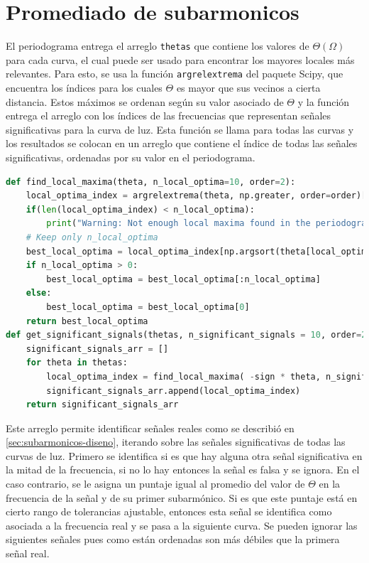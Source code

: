 \section{Promediado de subarmonicos}\label{sec:subarmonicos-implementacion}
El periodograma entrega el arreglo \texttt{thetas} que contiene los valores de $\Theta(\Omega)$ para cada curva, el cual puede ser usado para encontrar los mayores locales más relevantes. Para esto, se usa la función \texttt{argrelextrema} del paquete Scipy, que encuentra los índices para los cuales $\Theta$ es mayor que sus vecinos a cierta distancia. Estos máximos se ordenan según su valor asociado de $\Theta$ y la función entrega el arreglo con los índices de las frecuencias que representan señales significativas para la curva de luz. Esta función se llama para todas las curvas y los resultados se colocan en un arreglo que contiene el índice de todas las señales significativas, ordenadas por su valor en el periodograma.
\begin{lstlisting}[language=Python]
def find_local_maxima(theta, n_local_optima=10, order=2):
    local_optima_index = argrelextrema(theta, np.greater, order=order)[0]
    if(len(local_optima_index) < n_local_optima):
        print("Warning: Not enough local maxima found in the periodogram")
    # Keep only n_local_optima
    best_local_optima = local_optima_index[np.argsort(theta[local_optima_index])][::-1]
    if n_local_optima > 0:
        best_local_optima = best_local_optima[:n_local_optima]
    else:
        best_local_optima = best_local_optima[0]
    return best_local_optima
def get_significant_signals(thetas, n_significant_signals = 10, order=2, signal_diff_tolerance = 0.2, sign=-1, spacing=100):
    significant_signals_arr = []
    for theta in thetas:
        local_optima_index = find_local_maxima( -sign * theta, n_significant_signals, order)
        significant_signals_arr.append(local_optima_index)
    return significant_signals_arr
\end{lstlisting}
Este arreglo permite identificar señales reales como se describió en \ref{sec:subarmonicos-diseno}, iterando sobre las señales significativas de todas las curvas de luz. Primero se identifica si es que hay alguna otra señal significativa en la mitad de la frecuencia, si no lo hay entonces la señal es falsa y se ignora. En el caso contrario, se le asigna un puntaje igual al promedio del valor de $\Theta$ en la frecuencia de la señal y de su primer subarmónico. Si es que este puntaje está en cierto rango de tolerancias ajustable, entonces esta señal se identifica como asociada a la frecuencia real y se pasa a la siguiente curva. Se pueden ignorar las siguientes señales pues como están ordenadas son más débiles que la primera señal real.

